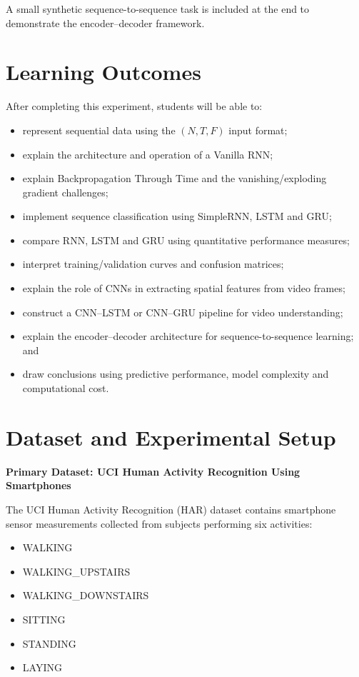 \documentclass[10pt]{article}
\begin{document}
A small synthetic sequence-to-sequence task is included at the end to
demonstrate the encoder--decoder framework.

\section{Learning Outcomes}

After completing this experiment, students will be able to:

\begin{itemize}
\item represent sequential data using the $(N,T,F)$ input format;
\item explain the architecture and operation of a Vanilla RNN;
\item explain Backpropagation Through Time and the vanishing/exploding gradient challenges;
\item implement sequence classification using SimpleRNN, LSTM and GRU;
\item compare RNN, LSTM and GRU using quantitative performance measures;
\item interpret training/validation curves and confusion matrices;
\item explain the role of CNNs in extracting spatial features from video frames;
\item construct a CNN--LSTM or CNN--GRU pipeline for video understanding;
\item explain the encoder--decoder architecture for sequence-to-sequence learning; and
\item draw conclusions using predictive performance, model complexity and computational cost.
\end{itemize}

\section{Dataset and Experimental Setup}

\textbf{Primary Dataset: UCI Human Activity Recognition Using Smartphones}

The UCI Human Activity Recognition (HAR) dataset contains smartphone sensor
measurements collected from subjects performing six activities:

\begin{itemize}
\item WALKING
\item WALKING\_UPSTAIRS
\item WALKING\_DOWNSTAIRS
\item SITTING
\item STANDING
\item LAYING
\end{itemize}
\end{document}
